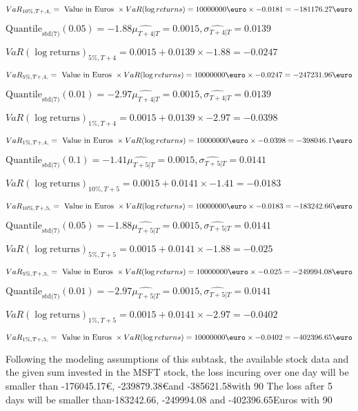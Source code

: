 $VaR_{10\%, T + ,4,} = \text{ Value in Euros } \times VaR(\log returns) = 10 000 000 \text{\euro} \times-0.0181 = -181176.27 \text{\euro}$


$\text{Quantile}_\text{std(7)}(0.05) = -1.88$$\hat{\mu_{T+4|T}} = 0.0015, \hat{\sigma_{T+4|T}} = 0.0139$

$VaR(\log \text{returns})_{5\%, T + 4} = 0.0015 + 0.0139\times-1.88 = -0.0247$

$VaR_{5\%, T + ,4,} = \text{ Value in Euros } \times VaR(\log returns) = 10 000 000 \text{\euro} \times-0.0247 = -247231.96 \text{\euro}$


$\text{Quantile}_\text{std(7)}(0.01) = -2.97$$\hat{\mu_{T+4|T}} = 0.0015, \hat{\sigma_{T+4|T}} = 0.0139$

$VaR(\log \text{returns})_{1\%, T + 4} = 0.0015 + 0.0139\times-2.97 = -0.0398$

$VaR_{1\%, T + ,4,} = \text{ Value in Euros } \times VaR(\log returns) = 10 000 000 \text{\euro} \times-0.0398 = -398046.1 \text{\euro}$


$\text{Quantile}_\text{std(7)}(0.1) = -1.41$$\hat{\mu_{T+5|T}} = 0.0015, \hat{\sigma_{T+5|T}} = 0.0141$

$VaR(\log \text{returns})_{10\%, T + 5} = 0.0015 + 0.0141\times-1.41 = -0.0183$

$VaR_{10\%, T + ,5,} = \text{ Value in Euros } \times VaR(\log returns) = 10 000 000 \text{\euro} \times-0.0183 = -183242.66 \text{\euro}$


$\text{Quantile}_\text{std(7)}(0.05) = -1.88$$\hat{\mu_{T+5|T}} = 0.0015, \hat{\sigma_{T+5|T}} = 0.0141$

$VaR(\log \text{returns})_{5\%, T + 5} = 0.0015 + 0.0141\times-1.88 = -0.025$

$VaR_{5\%, T + ,5,} = \text{ Value in Euros } \times VaR(\log returns) = 10 000 000 \text{\euro} \times-0.025 = -249994.08 \text{\euro}$


$\text{Quantile}_\text{std(7)}(0.01) = -2.97$$\hat{\mu_{T+5|T}} = 0.0015, \hat{\sigma_{T+5|T}} = 0.0141$

$VaR(\log \text{returns})_{1\%, T + 5} = 0.0015 + 0.0141\times-2.97 = -0.0402$

$VaR_{1\%, T + ,5,} = \text{ Value in Euros } \times VaR(\log returns) = 10 000 000 \text{\euro} \times-0.0402 = -402396.65 \text{\euro}$


Following the modeling assumptions of this subtask, the available stock data and the given sum invested in the MSFT stock, the loss incuring over one day will be smaller than -176045.17\euro, -239879.38\euro and -385621.58\euroEuros with 90%
The loss after 5 days will be smaller than-183242.66, -249994.08 and -402396.65Euros with 90%
 

